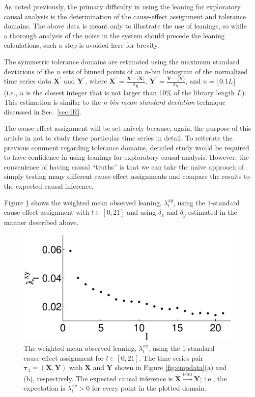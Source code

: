\documentclass[twocolumn,aps,pre,groupedaddress]{revtex4-1}
\begin{document}
As noted previously, the primary difficulty in using the leaning for exploratory causal analysis is the determination of the cause-effect assignment and tolerance domains.  The above data is meant only to illustrate the use of leanings, so while a thorough analysis of the noise in the system should precede the leaning calculations, such a step is avoided here for brevity.  

The symmetric tolerance domains are estimated using the maximum standard deviations of the $n$ sets of binned points of an $n$-bin histogram of the normalized time series data $\mathbf{X}^\prime$ and $\mathbf{Y}^\prime$, where $\mathbf{X}^\prime = \frac{\mathbf{X}-\langle \mathbf{X} \rangle}{\sigma_\mathbf{X}}$, $\mathbf{Y}^\prime = \frac{\mathbf{Y}-\langle \mathbf{Y} \rangle}{\sigma_\mathbf{Y}}$, and $n=\lfloor 0.1L\rfloor$ (i.e., $n$ is the closest integer that is not larger than 10\% of the library length $L$).  This estimation is similar to the {\em n-bin mean standard deviation} technique discussed in Sec.\ \ref{sec:IR}.

The cause-effect assignment will be set naively because, again, the purpose of this article in not to study these particular time series in detail.  To reiterate the previous comment regarding tolerance domains, detailed study would be required to have confidence in using leanings for exploratory causal analysis.  However, the convenience of having causal ``truths'' is that we can take the naive approach of simply testing many different cause-effect assignments and compare the results to the expected causal inference.

Figure \ref{fig:emp} shows the weighted mean observed leaning, $\lambda_l^{xy}$, using the $1$-standard cause-effect assignment with $l\in[0,21]$ and using $\delta_x$ and $\delta_y$ estimated in the manner described above.    
\begin{figure}
\includegraphics[scale=0.43]{EmpiricalData_p87leans.eps}
\caption{The weighted mean observed leaning, $\lambda_l^{xy}$, using the $1$-standard cause-effect assignment for $l\in[0,21]$.  The time series pair $\mathbf{\tau}_1 = (\mathbf{X},\mathbf{Y})$ with $\mathbf{X}$ and $\mathbf{Y}$ shown in Figure \ref{fig:empdata}(a) and (b), respectively.  The expected causal inference is $\mathbf{X}\xrightarrow{lean}\mathbf{Y}$; i.e., the expectation is $\lambda_l^{xy} > 0$ for every point in the plotted domain.}
\label{fig:emp}
\end{figure}
\end{document}
